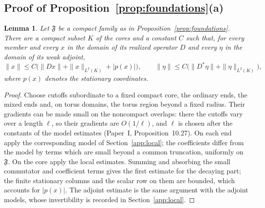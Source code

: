 \documentclass[11pt]{amsart}
\newtheorem{lemma}[theorem]{Lemma}
\theoremstyle{definition}
\theoremstyle{remark}
\theoremstyle{plain}
\numberwithin{equation}{section}
\begin{document}
\subsection{Proof of Proposition~\ref{prop:foundations}(a)}
\begin{lemma}\label{lem:compact-remainder}
Let $\mathfrak F$ be a compact family as in
Proposition~\ref{prop:foundations}. There are a compact subset $K$ of the
cores and a constant $C$ such that, for every member and every $x$ in
the domain of its realized operator $D$ and every $\eta$ in the domain
of its weak adjoint,
\[
 \|x\|\le C\bigl(\|Dx\|+\|x\|_{L^2(K)}+|p(x)|\bigr),\qquad
 \|\eta\|\le C\bigl(\|D^*\eta\|+\|\eta\|_{L^2(K)}\bigr),
\]
where $p(x)$ denotes the stationary coordinates.
\end{lemma}
\begin{proof}
Choose cutoffs subordinate to a fixed compact core, the ordinary ends,
the mixed ends and, on torus domains, the torus region beyond a fixed
radius. Their gradients can be made small on the noncompact overlaps:
there the cutoffs vary over a length $\ell$, so their gradients are
$O(1/\ell)$, and $\ell$ is chosen after the constants of the model
estimates (Paper~I, Proposition~10.27). On each end
apply the corresponding model of Section~\ref{app:local}; the
coefficients differ from the model by terms which are small beyond a
common truncation, uniformly on $\mathfrak F$. On the core apply the
local estimates. Summing and absorbing the small commutator and
coefficient terms gives the first estimate for the decaying part; the
finite stationary columns and the scalar row on them are bounded, which
accounts for $|p(x)|$. The adjoint estimate is the same argument with
the adjoint models, whose invertibility is recorded in
Section~\ref{app:local}.


\end{proof}
\end{document}
